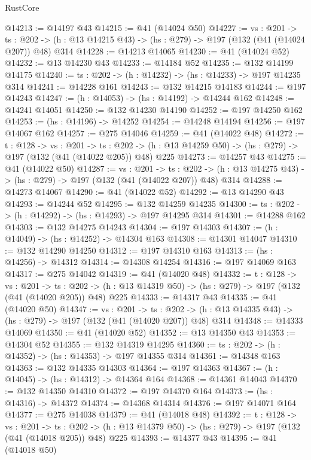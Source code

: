\begin{lexlean}{RustCore}
\begin{coremodule}
@14213 := @14197 @43
@14215 := @41 (@14024 @50)
@14227 := {vs : @201} ->
  {ts : @202} -> (h : @13 @14215 @43) -> (hs : @279) -> @197 (@132 (@41 (@14024 @207)) @48) @314
@14228 := @14213 @14065
@14230 := @41 (@14024 @52)
@14232 := @13 @14230 @43
@14233 := @14184 @52
@14235 := @132 @14199 @14175
@14240 := {ts : @202} -> (h : @14232) -> (hs : @14233) -> @197 @14235 @314
@14241 := @14228 @161
@14243 := @132 @14215 @14183
@14244 := @197 @14243
@14247 := (h : @14053) -> (hs : @14192) -> @14244 @162
@14248 := @14241 @14051
@14250 := @132 @14230 @14190
@14252 := @197 @14250 @162
@14253 := (hs : @14196) -> @14252
@14254 := @14248 @14194
@14256 := @197 @14067 @162
@14257 := @275 @14046
@14259 := @41 (@14022 @48)
@14272 := {t : @128} ->
  {vs : @201} ->
  {ts : @202} -> (h : @13 @14259 @50) -> (hs : @279) -> @197 (@132 (@41 (@14022 @205)) @48) @225
@14273 := @14257 @43
@14275 := @41 (@14022 @50)
@14287 := {vs : @201} ->
  {ts : @202} -> (h : @13 @14275 @43) -> (hs : @279) -> @197 (@132 (@41 (@14022 @207)) @48) @314
@14288 := @14273 @14067
@14290 := @41 (@14022 @52)
@14292 := @13 @14290 @43
@14293 := @14244 @52
@14295 := @132 @14259 @14235
@14300 := {ts : @202} -> (h : @14292) -> (hs : @14293) -> @197 @14295 @314
@14301 := @14288 @162
@14303 := @132 @14275 @14243
@14304 := @197 @14303
@14307 := (h : @14049) -> (hs : @14252) -> @14304 @163
@14308 := @14301 @14047
@14310 := @132 @14290 @14250
@14312 := @197 @14310 @163
@14313 := (hs : @14256) -> @14312
@14314 := @14308 @14254
@14316 := @197 @14069 @163
@14317 := @275 @14042
@14319 := @41 (@14020 @48)
@14332 := {t : @128} ->
  {vs : @201} ->
  {ts : @202} -> (h : @13 @14319 @50) -> (hs : @279) -> @197 (@132 (@41 (@14020 @205)) @48) @225
@14333 := @14317 @43
@14335 := @41 (@14020 @50)
@14347 := {vs : @201} ->
  {ts : @202} -> (h : @13 @14335 @43) -> (hs : @279) -> @197 (@132 (@41 (@14020 @207)) @48) @314
@14348 := @14333 @14069
@14350 := @41 (@14020 @52)
@14352 := @13 @14350 @43
@14353 := @14304 @52
@14355 := @132 @14319 @14295
@14360 := {ts : @202} -> (h : @14352) -> (hs : @14353) -> @197 @14355 @314
@14361 := @14348 @163
@14363 := @132 @14335 @14303
@14364 := @197 @14363
@14367 := (h : @14045) -> (hs : @14312) -> @14364 @164
@14368 := @14361 @14043
@14370 := @132 @14350 @14310
@14372 := @197 @14370 @164
@14373 := (hs : @14316) -> @14372
@14374 := @14368 @14314
@14376 := @197 @14071 @164
@14377 := @275 @14038
@14379 := @41 (@14018 @48)
@14392 := {t : @128} ->
  {vs : @201} ->
  {ts : @202} -> (h : @13 @14379 @50) -> (hs : @279) -> @197 (@132 (@41 (@14018 @205)) @48) @225
@14393 := @14377 @43
@14395 := @41 (@14018 @50)

\end{coremodule}
\end{lexlean}
